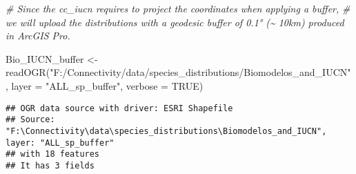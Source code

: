 \documentclass[
]{article}
\newenvironment{Shaded}{\begin{snugshade}}{\end{snugshade}}
\newcommand{\AttributeTok}[1]{\textcolor[rgb]{0.77,0.63,0.00}{#1}}
\newcommand{\CommentTok}[1]{\textcolor[rgb]{0.56,0.35,0.01}{\textit{#1}}}
\newcommand{\ConstantTok}[1]{\textcolor[rgb]{0.00,0.00,0.00}{#1}}
\newcommand{\FunctionTok}[1]{\textcolor[rgb]{0.00,0.00,0.00}{#1}}
\newcommand{\NormalTok}[1]{#1}
\newcommand{\OtherTok}[1]{\textcolor[rgb]{0.56,0.35,0.01}{#1}}
\newcommand{\StringTok}[1]{\textcolor[rgb]{0.31,0.60,0.02}{#1}}
\begin{document}
\begin{Shaded}
\begin{Highlighting}[]
\CommentTok{\# Since the cc\_iucn requires to project the coordinates when applying a buffer, }
\CommentTok{\# we will upload the distributions with a geodesic buffer of 0.1° (\textasciitilde{} 10km) produced in ArcGIS Pro. }

\NormalTok{Bio\_IUCN\_buffer }\OtherTok{\textless{}{-}} \FunctionTok{readOGR}\NormalTok{(}\StringTok{"F:/Connectivity/data/species\_distributions/Biomodelos\_and\_IUCN"}\NormalTok{, }\AttributeTok{layer =} \StringTok{"ALL\_sp\_buffer"}\NormalTok{, }\AttributeTok{verbose =} \ConstantTok{TRUE}\NormalTok{)}
\end{Highlighting}
\end{Shaded}

\begin{verbatim}
## OGR data source with driver: ESRI Shapefile 
## Source: "F:\Connectivity\data\species_distributions\Biomodelos_and_IUCN", layer: "ALL_sp_buffer"
## with 18 features
## It has 3 fields
\end{verbatim}
\end{document}
